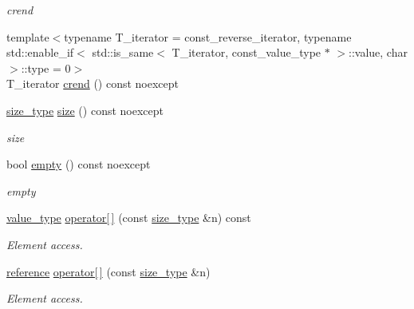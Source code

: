 \begin{DoxyCompactItemize}
\begin{DoxyCompactList}\small\item\em crend \end{DoxyCompactList}\item 
{\footnotesize template$<$typename T\+\_\+iterator  = const\+\_\+reverse\+\_\+iterator, typename std\+::enable\+\_\+if$<$ std\+::is\+\_\+same$<$ T\+\_\+iterator, const\+\_\+value\+\_\+type $\ast$ $>$\+::value, char $>$\+::type  = 0$>$ }\\T\+\_\+iterator \hyperlink{classIceBRG_1_1labeled__array__row__reference_a2a2500834824ec67a61f748375e66c62}{crend} () const  noexcept
\item 
\hyperlink{classIceBRG_1_1labeled__array__row__reference_a80c5d11ebfa639fa27894ce288633df0}{size\+\_\+type} \hyperlink{classIceBRG_1_1labeled__array__row__reference_ab4e97720dc6fe2d271e3e0b14457089a}{size} () const  noexcept
\begin{DoxyCompactList}\small\item\em size \end{DoxyCompactList}\item 
bool \hyperlink{classIceBRG_1_1labeled__array__row__reference_ab220e53aa76e04b91490b69d2a96c80c}{empty} () const  noexcept
\begin{DoxyCompactList}\small\item\em empty \end{DoxyCompactList}\item 
\hyperlink{classIceBRG_1_1labeled__array__row__reference_ae6cfe4bdcb3bc59c3d7613193633f063}{value\+\_\+type} \hyperlink{classIceBRG_1_1labeled__array__row__reference_a7901cf2168312de2ecc2c76f1ab48626}{operator\mbox{[}$\,$\mbox{]}} (const \hyperlink{classIceBRG_1_1labeled__array__row__reference_a80c5d11ebfa639fa27894ce288633df0}{size\+\_\+type} \&n) const 
\begin{DoxyCompactList}\small\item\em Element access. \end{DoxyCompactList}\item 
\hyperlink{classIceBRG_1_1labeled__array__row__reference_a24c2694c9ca46757f21f7024a229c925}{reference} \hyperlink{classIceBRG_1_1labeled__array__row__reference_a4ec0100a9da99645d7a920af8c540adb}{operator\mbox{[}$\,$\mbox{]}} (const \hyperlink{classIceBRG_1_1labeled__array__row__reference_a80c5d11ebfa639fa27894ce288633df0}{size\+\_\+type} \&n)
\begin{DoxyCompactList}\small\item\em Element access. \end{DoxyCompactList}\item 

\end{DoxyCompactItemize}

